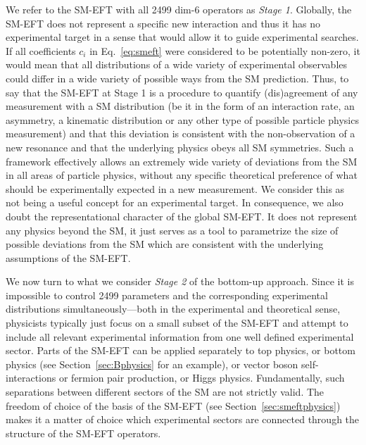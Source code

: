 We refer to the SM-EFT with all 2499 dim-6 operators as \emph{Stage 1}.
Globally, the SM-EFT does not represent a specific new interaction
and thus it has no experimental target in a sense that would allow it to
guide experimental searches.  If all coefficients 
$c_i$ in Eq.~\ref{eq:smeft}
were considered to be potentially non-zero, it would mean that all
distributions of a wide variety of experimental observables could
differ in a wide variety of possible ways from the SM prediction.
Thus, to say that the SM-EFT at Stage 1 is a procedure to quantify (dis)agreement of any measurement with a SM distribution (be it in the form of an interaction rate, an asymmetry, a kinematic
distribution or any other type of possible particle physics
measurement) and that this deviation is consistent with the non-observation
of a new resonance and that the underlying physics obeys all SM
symmetries. 
Such a framework effectively allows an extremely wide variety
of deviations from the SM in all areas of particle physics, without
any specific theoretical preference of what should be experimentally
expected in a new measurement. We consider this as not being a
useful concept for an experimental target. In consequence, we also doubt the
representational character of the global SM-EFT. It does not represent any physics beyond the SM, it just serves as a tool to
parametrize the size of possible deviations from the SM which are
consistent with the underlying assumptions of the SM-EFT. 

We now turn to what we consider \emph{Stage 2} of the bottom-up approach.
Since it is impossible to control
2499 parameters and the corresponding experimental distributions
simultaneously---both in the experimental and theoretical
sense, physicists typically just focus on a small subset of the SM-EFT and attempt to
include all relevant experimental information from one well defined
experimental sector. 
Parts of the SM-EFT can be applied separately to top physics, or bottom
physics (see Section~\ref{sec:Bphysics} for an example), or vector boson
self-interactions or fermion pair production, or Higgs physics. 
Fundamentally, such separations between different sectors of the SM
are not strictly valid. The freedom of choice of the basis of the
SM-EFT (see Section~\ref{sec:smeftphysics}) makes it a matter of
choice which experimental sectors are connected through the structure
of the SM-EFT operators.

